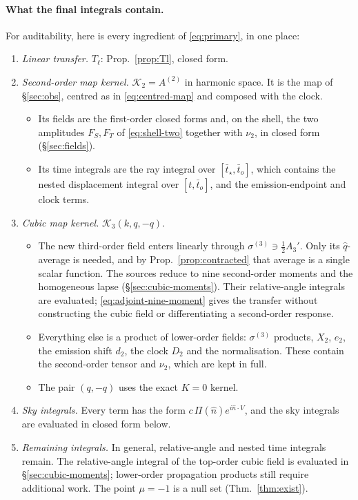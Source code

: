 \documentclass[11pt]{article}
\theoremstyle{definition}
\theoremstyle{remark}
\newcommand{\nh}{\hat n}
\begin{document}
\paragraph{What the final integrals contain.} For auditability, here is every ingredient of
\eqref{eq:primary}, in one place:
\begin{enumerate}
\item \emph{Linear transfer.} $T_\ell$: Prop.~\ref{prop:Tl}, closed form.
\item \emph{Second-order map kernel.} $\mathcal K_2=A^{(2)}$ in harmonic space. It is the map of
  \S\ref{sec:obs}, centred as in \eqref{eq:centred-map} and composed with the clock.
  \begin{itemize}
  \item Its fields are the first-order closed forms and, on the shell, the two amplitudes
    $F_S,F_T$ of \eqref{eq:shell-two} together with $\nu_2$, in closed form (\S\ref{sec:fields}).
  \item Its time integrals are the ray integral over $[\bar t_\star,\bar t_o]$, which contains the
    nested displacement integral over $[t,\bar t_o]$, and the emission-endpoint and clock terms.
  \end{itemize}
\item \emph{Cubic map kernel.} $\mathcal K_3(k,q,-q)$.
  \begin{itemize}
  \item The new third-order field enters linearly through
    $\sigma^{(3)}\ni\frac12A_3'$. Only its $\hat q$-average is needed, and by
    Prop.~\ref{prop:contracted} that average is a single scalar function. The sources reduce to
    nine second-order moments and the homogeneous lapse (\S\ref{sec:cubic-moments}). Their
    relative-angle integrals are evaluated; \eqref{eq:adjoint-nine-moment} gives the transfer
    without constructing the cubic field or differentiating a second-order response.
  \item Everything else is a product of lower-order fields: $\sigma^{(3)}$ products, $X_2$, $e_2$,
    the emission shift $d_2$, the clock $D_2$ and the normalisation. These contain the
    second-order tensor and $\nu_2$, which are kept in full.
  \item The pair $(q,-q)$ uses the exact $K=0$ kernel.
  \end{itemize}
\item \emph{Sky integrals.} Every term has the form $c\,\Pi(\nh)e^{i\nh\cdot V}$, and the sky
  integrals are evaluated in closed form below.
\item \emph{Remaining integrals.} In general, relative-angle and nested time integrals remain.
  The relative-angle integral of the top-order cubic field is evaluated in
  \S\ref{sec:cubic-moments}; lower-order propagation products still require additional work.
  The point $\mu=-1$ is a null set (Thm.~\ref{thm:exist}).
\end{enumerate}
\end{document}
